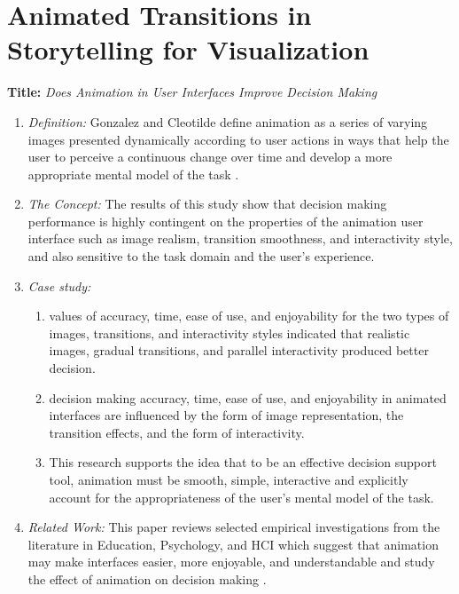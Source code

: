 \documentclass{egpubl}
\begin{document}
\section{Animated Transitions in Storytelling for Visualization}
\textbf{Title:} \textit{Does Animation in User Interfaces Improve Decision Making}
\begin{enumerate}
\item \textit{Definition:} Gonzalez and Cleotilde define animation as a series of varying images presented dynamically according to user actions in ways that help the user to perceive a continuous change over time and develop a more appropriate mental model of the task \cite{gonzalez1995animation}.
\item \textit{The Concept:} The results of this study show that decision making performance is highly contingent on the properties of the animation user interface such as image realism, transition smoothness, and interactivity style, and also sensitive to the task domain and the user's experience.  
\item \textit{Case study:}
\begin{enumerate}
\item values of accuracy, time, ease of use, and enjoyability for the two types of images, transitions, and interactivity styles indicated that realistic images, gradual transitions, and parallel interactivity produced better decision.
\item decision making accuracy, time, ease of use, and enjoyability in animated interfaces are influenced by the form of image representation, the transition effects, and the form of interactivity.
\item This research supports the idea that to be an effective decision support tool, animation must be smooth, simple, interactive and explicitly account for the appropriateness of the user's mental model of the task.
\end{enumerate}
\item \textit{Related Work:} This paper reviews selected empirical investigations from the literature in Education, Psychology, and HCI which suggest that animation may make interfaces easier, more enjoyable, and understandable and study the effect of animation on decision making \cite{gonzalez1996does}.
\end{enumerate}
\end{document}
